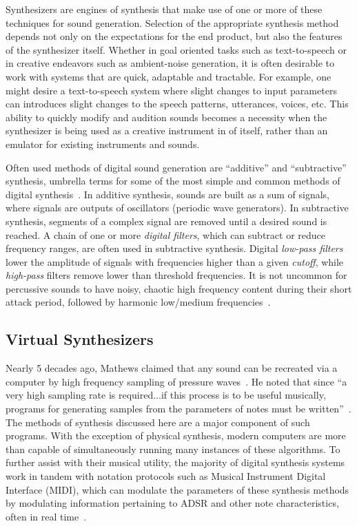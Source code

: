 \documentclass[\main/thesis.tex]{subfiles}
\begin{document}
Synthesizers are engines of synthesis that make use of one or more of these techniques for sound generation. Selection of the appropriate synthesis method depends not only on the expectations for the end product, but also the features of the synthesizer itself. Whether in goal oriented tasks such as text-to-speech or in creative endeavors such as ambient-noise generation, it is often desirable to work with systems that are quick, adaptable and tractable. For example, one might desire a text-to-speech system where slight changes to input parameters can introduces slight changes to the speech patterns, utterances, voices, etc. This ability to quickly modify and audition sounds becomes a necessity when the synthesizer is being used as a creative instrument in of itself, rather than an emulator for existing instruments and sounds. 

Often used methods of digital sound generation are \enquote{additive} and \enquote{subtractive} synthesis, umbrella terms for some of the most simple and common methods of digital synthesis~\cite{mitchell2009basicsynthChap1}. 
In additive synthesis, sounds are built as a sum of signals, where signals are outputs of oscillators (periodic wave generators).  In subtractive synthesis, segments of a complex signal are removed until a desired sound is reached. A chain of one or more \textit{digital filters}, which can subtract or reduce frequency ranges, are often used in subtractive synthesis. Digital \textit{low-pass filters} lower the amplitude of signals with frequencies higher than a given \textit{cutoff}, while \textit{high-pass} filters remove lower than threshold frequencies. It is not uncommon for percussive sounds to have noisy, chaotic high frequency content during their short attack period, followed by harmonic low/medium frequencies~\cite{lakatos2000common}.


\subsection{Virtual Synthesizers}
Nearly 5 decades ago, Mathews claimed that any sound can be recreated via a computer by high frequency sampling of pressure waves~\cite{mathews1963digital}. He noted that since \enquote{a very high sampling rate is required...if this process is to be useful musically, programs for generating samples from the parameters of notes must be written}~\cite{mathews1963digital}. The methods of synthesis discussed here are a major component of such programs. With the exception of physical synthesis, modern computers are more than capable of simultaneously running many instances of these algorithms. To further assist with their musical utility, the majority of digital synthesis systems work in tandem with notation protocols such as Musical Instrument Digital Interface (MIDI), which can modulate the parameters of these synthesis methods by modulating information pertaining to ADSR and other note characteristics, often in real time~\cite{moog1986midi}.  
\end{document}

